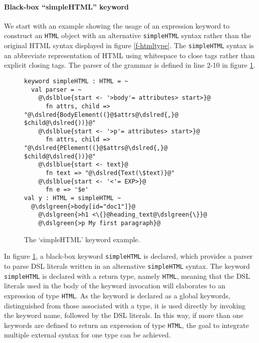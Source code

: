 \documentclass{sig-alternate}
\newcommand{\dslgreen}[1]{\textcolor[HTML]{339933}{#1}}
\newcommand{\dslblue}[1]{\textcolor[HTML]{336699}{#1}}
\newcommand{\dslred}[1]{\textcolor[HTML]{FF0033}{#1}}
\begin{document}
\paragraph{Black-box ``simpleHTML'' keyword}
We start with an example showing the usage of an expression keyword to construct an \verb|HTML| object with an alternative \verb|simpleHTML| syntax rather than the original HTML syntax displayed in figure \ref{f-htmltype}. The \verb|simpleHTML| syntax is an abbreviate representation of HTML using whitespace to close tags rather than explicit closing tags. The parser of the grammar is defined in line 2-10 in figure \ref{f-simplehtml}.
\begin{figure}[ht]
\begin{lstlisting}[style=wyvern]
keyword simpleHTML : HTML = ~
  val parser = ~
    @\dslblue{start <- '>body'= attributes> start>}@
      fn attrs, child => "@\dslred{BodyElement((}@$attrs@\dslred{,}@ $child@\dslred{))}@"
    @\dslblue{start <- '>p'= attributes> start>}@
      fn attrs, child => "@\dslred{PElement((}@$attrs@\dslred{,}@ $child@\dslred{))}@"
    @\dslblue{start <- text}@
      fn text => "@\dslred{Text(\$text)}@"
    @\dslblue{start <- '<'= EXP>}@
      fn e => '$e'
val y : HTML = simpleHTML ~
  @\dslgreen{>body[id="doc1"]}@
    @\dslgreen{>h1 <\{}@heading_text@\dslgreen{\}}@
    @\dslgreen{>p My first paragraph}@
\end{lstlisting}
\vspace{-8px}
\caption{The `simpleHTML' keyword example.}
\vspace{-10px}
\label{f-simplehtml}
\end{figure}

In figure \ref{f-simplehtml}, a black-box keyword \texttt{simpleHTML} is declared, which provides a parser to parse DSL literals written in an alternative \verb|simpleHTML| syntax. The keyword \texttt{simpleHTML} is declared with a return type, namely \texttt{HTML}, meaning that the DSL literals used in the body of the keyword invocation will elaborates to an expression of type \texttt{HTML}. As the keyword is declared as a global keywords, distinguished from those associated with a type, it is used directly by invoking the keyword name, followed by the DSL literals. In this way, if more than one keywords are defined to return an expression of type \verb|HTML|, the goal to integrate multiple external syntax for one type can be achieved.
\end{document}

